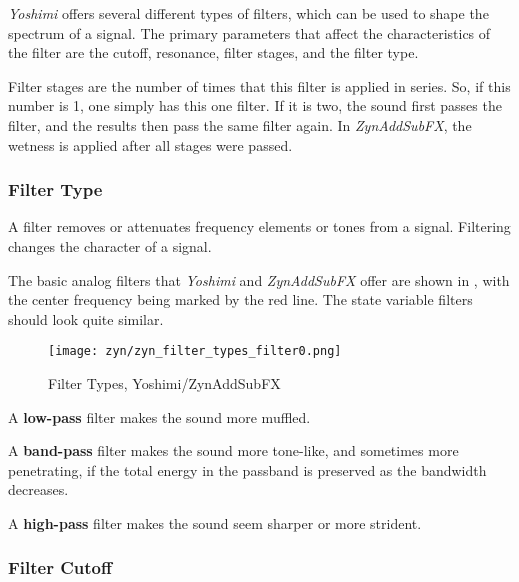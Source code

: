    \textsl{Yoshimi}
   offers several different types of filters, which can be used to
   shape the spectrum of a signal. The primary parameters that affect the
   characteristics of the filter are the cutoff, resonance, filter stages, and
   the filter type.

   Filter stages are the number of times that this filter is applied in
   series. So, if this number is 1, one simply has this one filter. If it is
   two, the sound first passes the filter, and the results then pass the same
   filter again. In \textsl{ZynAddSubFX}, the wetness is applied after all
   stages were passed.

\subsubsection{Filter Type}
\label{subsubsec:filter_type}

   A filter removes or attenuates frequency elements or tones from a signal.
   Filtering changes the character of a signal.

   The basic analog filters that \textsl{Yoshimi} and \textsl{ZynAddSubFX}
   offer are shown in , with
   the center frequency being marked by the red
   line. The state variable filters should look quite similar.

\begin{figure}[H]          %
   \centering
   \texttt{[image: zyn/zyn\_filter\_types\_filter0.png]}
   \caption[Basic Filter Types]{Filter Types, Yoshimi/ZynAddSubFX}
   \label{fig:basic_filter_types}
\end{figure}

   \begin{enumber}
      \item A \textbf{low-pass} filter makes the sound more muffled.
      \item A \textbf{band-pass} filter makes the sound more tone-like, and
         sometimes more penetrating, if the total energy in the passband is
         preserved as the bandwidth decreases.
      \item A \textbf{high-pass} filter makes the sound seem sharper or more
         strident.
   \end{enumber}

\subsubsection{Filter Cutoff}
\label{subsubsec:filter_cutoff}


